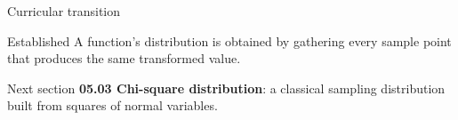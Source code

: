 \documentclass[10pt,aspectratio=169]{beamer}
\begin{document}
\begin{frame}{Curricular transition}
  \footnotesize
  \begin{block}{Established}
    A function's distribution is obtained by gathering every sample point that
    produces the same transformed value.
  \end{block}
  \begin{alertblock}{Next section}
    \textbf{05.03 Chi-square distribution}: a classical sampling distribution
    built from squares of normal variables.
  \end{alertblock}
\end{frame}
\end{document}
